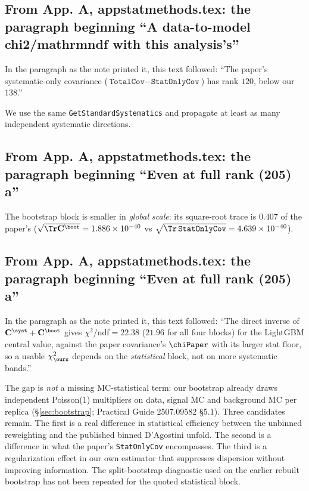 \subsection{From App. A, appstatmethods.tex: the paragraph beginning ``A data-to-model chi2/mathrmndf with this analysis's''}
In the paragraph as the note printed it, this text followed: ``The paper's systematic-only covariance ($\texttt{TotalCov}-\texttt{StatOnlyCov}$) has rank $120$, below our $138$.''\par
We use the same \texttt{GetStandardSystematics} and propagate at least as many independent systematic directions.

\subsection{From App. A, appstatmethods.tex: the paragraph beginning ``Even at full rank (205) a''}
The bootstrap block is smaller in \emph{global scale}: its square-root trace is $0.407$ of the paper's ($\sqrt{\Tr\mathbf{C}^{\boot}}=1.886\times10^{-40}$ vs $\sqrt{\Tr\,\texttt{StatOnlyCov}}=4.639\times10^{-40}$).

\subsection{From App. A, appstatmethods.tex: the paragraph beginning ``Even at full rank (205) a''}
In the paragraph as the note printed it, this text followed: ``The direct inverse of $\mathbf{C}^{\syst}+\mathbf{C}^{\boot}$ gives $\chi^{2}/\mathrm{ndf}=22.38$ ($21.96$ for all four blocks) for the LightGBM central value, against the paper covariance's $\chiPaper$ with its larger stat floor, so a usable $\chi^{2}_{\ours}$ depends on the \emph{statistical} block, not on more systematic bands.''\par
The gap is \emph{not} a missing MC-statistical term: our bootstrap already draws independent Poisson($1$) multipliers on data, signal MC and background MC per replica (\S\ref{sec:bootstrap}; Practical Guide 2507.09582 \S5.1). Three candidates remain. The first is a real difference in statistical efficiency between the unbinned reweighting and the published binned D'Agostini unfold. The second is a difference in what the paper's \texttt{StatOnlyCov} encompasses. The third is a regularization effect in our own estimator that suppresses dispersion without improving information. The split-bootstrap diagnostic used on the earlier rebuilt bootstrap has not been repeated for the quoted statistical block.

